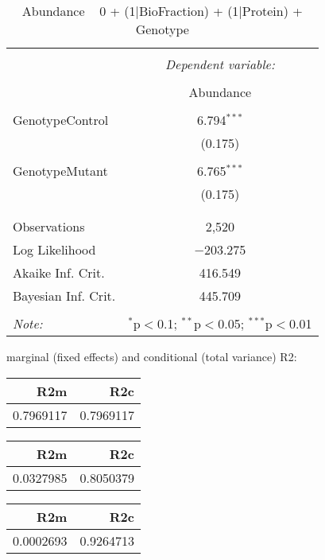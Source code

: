 \documentclass[11pt]{report}
\begin{document}
\begin{table}[!htbp] \centering 
  \caption{Abundance ~ 0 + (1|BioFraction) + (1|Protein) + Genotype} 
  \label{} 
\begin{tabular}{@{\extracolsep{5pt}}lc} 
\\[-1.8ex]\hline 
\hline \\[-1.8ex] 
 & \multicolumn{1}{c}{\textit{Dependent variable:}} \\ 
\cline{2-2} 
\\[-1.8ex] & Abundance \\ 
\hline \\[-1.8ex] 
 GenotypeControl & 6.794$^{***}$ \\ 
  & (0.175) \\ 
  & \\ 
 GenotypeMutant & 6.765$^{***}$ \\ 
  & (0.175) \\ 
  & \\ 
\hline \\[-1.8ex] 
Observations & 2,520 \\ 
Log Likelihood & $-$203.275 \\ 
Akaike Inf. Crit. & 416.549 \\ 
Bayesian Inf. Crit. & 445.709 \\ 
\hline 
\hline \\[-1.8ex] 
\textit{Note:}  & \multicolumn{1}{r}{$^{*}$p$<$0.1; $^{**}$p$<$0.05; $^{***}$p$<$0.01} \\ 
\end{tabular} 
\end{table} 
marginal (fixed effects) and conditional (total variance) R2:

\begin{tabular}{r|r}
\hline
R2m & R2c\\
\hline
0.7969117 & 0.7969117\\
\hline
\end{tabular}

\begin{tabular}{r|r}
\hline
R2m & R2c\\
\hline
0.0327985 & 0.8050379\\
\hline
\end{tabular}

\begin{tabular}{r|r}
\hline
R2m & R2c\\
\hline
0.0002693 & 0.9264713\\
\hline
\end{tabular}
\end{document}
